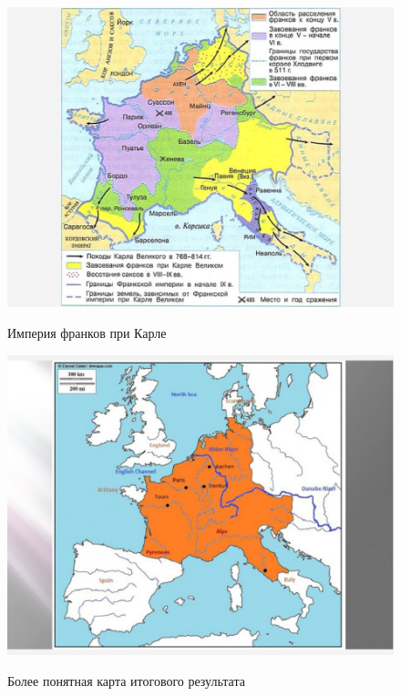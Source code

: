 \begin{figure}[h!tb]
	\centering\includegraphics[scale=0.4]{Relig_gambit/1572932602124725131.png}
	\label{fig:gambit12} %
	\caption{Империя франков при Карле	}
\end{figure}
\begin{figure}[h!tb]
	\centering\includegraphics[scale=0.4]{Relig_gambit/1572932634110060550.png}
	\label{fig:gambit13} %
	\caption{Более понятная карта итогового результата	}
\end{figure}

